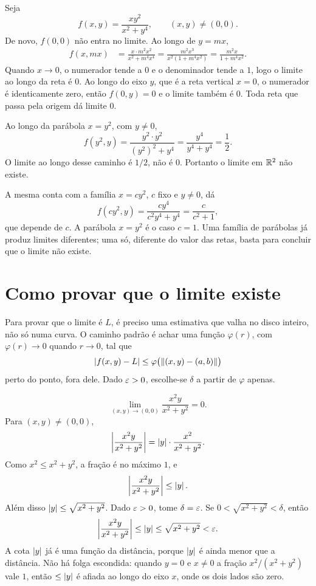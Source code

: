 \documentclass[11pt,a4paper]{article}
\begin{document}
\begin{contraexemplo}
Seja
\[
f(x,y)=\frac{x y^2}{x^2+y^4},\qquad (x,y)\neq(0,0).
\]
De novo, $f(0,0)$ não entra no limite. Ao longo de $y=mx$,
\begin{align*}
f(x,mx)
&=\frac{x\cdot m^2 x^2}{x^2+m^4 x^4}
=\frac{m^2 x^3}{x^2(1+m^4 x^2)}
=\frac{m^2 x}{1+m^4 x^2}.
\end{align*}
Quando $x\to 0$, o numerador tende a $0$ e o denominador tende a $1$, logo o limite ao longo da reta é $0$. Ao longo do eixo $y$, que é a reta vertical $x=0$, o numerador é identicamente zero, então $f(0,y)=0$ e o limite também é $0$. Toda reta que passa pela origem dá limite $0$.

Ao longo da parábola $x=y^2$, com $y\neq 0$,
\[
f(y^2,y)=\frac{y^2\cdot y^2}{(y^2)^2+y^4}=\frac{y^4}{y^4+y^4}=\frac{1}{2}.
\]
O limite ao longo desse caminho é $1/2$, não é $0$. Portanto o limite em $\mathbb{R}^2$ não existe.

A mesma conta com a família $x=c y^2$, $c$ fixo e $y\neq 0$, dá
\[
f(c y^2,y)=\frac{c y^4}{c^2 y^4+y^4}=\frac{c}{c^2+1},
\]
que depende de $c$. A parábola $x=y^2$ é o caso $c=1$. Uma família de parábolas já produz limites diferentes; uma só, diferente do valor das retas, basta para concluir que o limite não existe.
\end{contraexemplo}

\section{Como provar que o limite existe}

Para provar que o limite é $L$, é preciso uma estimativa que valha no disco inteiro, não só numa curva. O caminho padrão é achar uma função $\varphi(r)$, com $\varphi(r)\to 0$ quando $r\to 0$, tal que
\[
\left\lvert f(x,y)-L \right\rvert\le \varphi\bigl(\left\lVert (x,y)-(a,b) \right\rVert\bigr)
\]
perto do ponto, fora dele. Dado $\varepsilon>0$, escolhe-se $\delta$ a partir de $\varphi$ apenas.

\begin{exemplo}
\[
\lim_{(x,y)\to(0,0)}\frac{x^2 y}{x^2+y^2}=0.
\]
Para $(x,y)\neq(0,0)$,
\[
\left\lvert \frac{x^2 y}{x^2+y^2} \right\rvert
=\left\lvert y \right\rvert\cdot\frac{x^2}{x^2+y^2}.
\]
Como $x^2\le x^2+y^2$, a fração é no máximo $1$, e
\[
\left\lvert \frac{x^2 y}{x^2+y^2} \right\rvert\le\left\lvert y \right\rvert.
\]
Além disso $\left\lvert y \right\rvert\le\sqrt{x^2+y^2}$. Dado $\varepsilon>0$, tome $\delta=\varepsilon$. Se $0<\sqrt{x^2+y^2}<\delta$, então
\[
\left\lvert \frac{x^2 y}{x^2+y^2} \right\rvert\le\left\lvert y \right\rvert\le\sqrt{x^2+y^2}<\varepsilon.
\]
A cota $\left\lvert y \right\rvert$ já é uma função da distância, porque $\left\lvert y \right\rvert$ é ainda menor que a distância. Não há folga escondida: quando $y=0$ e $x\neq 0$ a fração $x^2/(x^2+y^2)$ vale $1$, então $\le\left\lvert y \right\rvert$ é afiada ao longo do eixo $x$, onde os dois lados são zero.
\end{exemplo}
\end{document}
